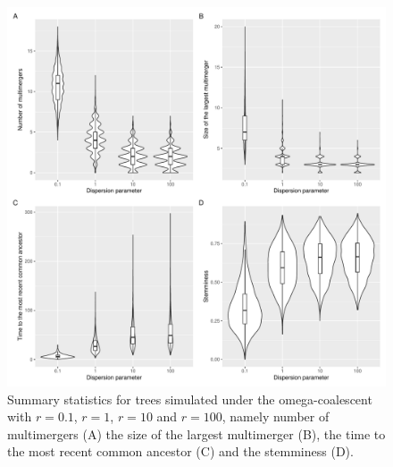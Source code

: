 \documentclass{article}
\begin{document}
\begin{figure}[!p]
\begin{center}
\includegraphics[width=15cm]{../run/figureStats.pdf}
\end{center}
\caption{Summary statistics for trees simulated under the omega-coalescent with $r=0.1$, $r=1$, $r=10$ and $r=100$, namely number of multimergers (A) the size of the largest multimerger (B), the time to the most recent common ancestor (C) and the stemminess (D). 
\label{fig:stats}}
\end{figure}
\end{document}
